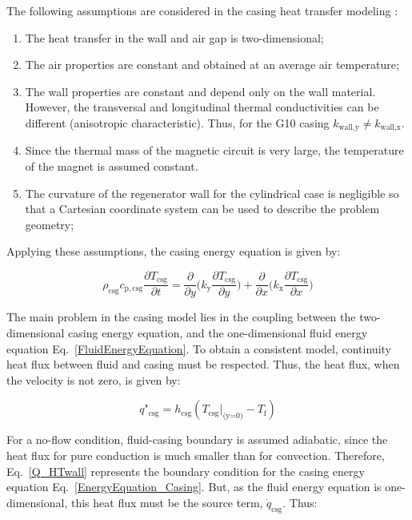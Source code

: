 \documentclass[review,preprint,12pt]{elsarticle}
\begin{document}
The following assumptions are considered in the casing heat transfer modeling \cite{Trevizoli2015}:

\begin{enumerate}
\item  The heat transfer in the wall and air gap is two-dimensional;
\item  The air properties are constant and obtained at an average air temperature;
\item  The wall properties are constant and depend only on the wall material. However, the transversal and longitudinal thermal conductivities can be different (anisotropic characteristic). Thus, for the G10 casing $k_\textrm{wall,y} \neq k_\textrm{wall,x}$.
\item  Since the thermal mass of the magnetic circuit is very large, the temperature of the magnet is assumed constant.
\item The curvature of the regenerator wall for the cylindrical case is negligible so that a Cartesian coordinate system can be used to describe the problem geometry;
\end{enumerate}

Applying these assumptions, the casing energy equation is given by:


\begin{equation}
\rho_\textrm{csg} c_\mathrm{p,csg}\frac{\partial T_\textrm{csg}}{\partial t} = \frac{\partial}{\partial y}\Bigg(k_\mathrm{y}\frac{\partial T_\textrm{csg}}{\partial y}\Bigg) + \frac{\partial}{\partial x}\Bigg(k_\mathrm{x}\frac{\partial T_\textrm{csg}}{\partial x}\Bigg)
\label{EnergyEquation_Casing}
\end{equation}

The main problem in the casing model lies in the coupling between the two-dimensional casing energy equation, and the one-dimensional fluid energy equation Eq.~\eqref{FluidEnergyEquation}. To obtain a consistent model, continuity heat flux between fluid and casing must be respected. Thus, the heat flux, when the velocity is not zero, is given by:

\begin{equation}
q\textrm{"}_\textrm{csg} =  h_\textrm{csg}(T_\textrm{csg}|_\textrm{(y=0)} - T_\textrm{f})
\label{Q_HTwall}
\end{equation}

For a no-flow condition, fluid-casing boundary is assumed adiabatic, since the heat flux for pure conduction is much smaller than for convection. Therefore, Eq.~\eqref{Q_HTwall} represents the boundary condition for the casing energy equation Eq.~\eqref{EnergyEquation_Casing}. But, as the fluid energy equation is one-dimensional, this heat flux must be the source term, $\dot{q}_\textrm{csg}$. Thus:
\end{document}
